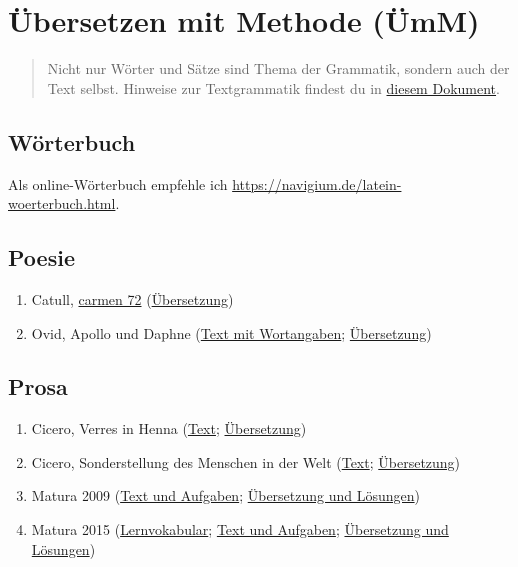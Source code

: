 \documentclass{scrartcl}
\begin{document}
\section{Übersetzen mit Methode (ÜmM)}
\label{sec:org364c73a}
\begin{quote}
Nicht nur Wörter und Sätze sind Thema der Grammatik, sondern auch der Text selbst. Hinweise zur Textgrammatik findest du in \href{https://www.dropbox.com/s/fbswvhejksw6kl6/pronomina.pdf?dl=0}{diesem Dokument}.
\end{quote}

\subsection{Wörterbuch}
\label{sec:org921034b}
Als online-Wörterbuch empfehle ich \url{https://navigium.de/latein-woerterbuch.html}.

\subsection{Poesie}
\label{sec:org08a901e}
\begin{enumerate}
\item Catull, \href{https://www.dropbox.com/s/kc2coqw11nfxyj1/Catull72.pdf?dl=0}{carmen 72} (\href{http://www.gottwein.de/Lat/catull/catull072.php}{Übersetzung})
\item Ovid, Apollo und Daphne (\href{https://www.dropbox.com/s/g60dha8uuh5h0po/OVIDApolloDaphne.pdf?dl=0}{Text mit Wortangaben}; \href{https://www.dropbox.com/s/366v4v48njyzebm/\%25C3\%259CApollDaphne.pdf?dl=0}{Übersetzung})
\end{enumerate}

\subsection{Prosa}
\label{sec:org26a2877}
\begin{enumerate}
\item Cicero, Verres in Henna (\href{https://www.dropbox.com/s/gqrgxo7yjxglmdv/Matura\_LatInt\_schriftlich\_2016.pdf?dl=0}{Text}; \href{https://www.dropbox.com/s/h6y42hky2w0o2x9/\%25C3\%259Cbersetzung.pdf?dl=0}{Übersetzung})
\item Cicero, Sonderstellung des Menschen in der Welt (\href{https://www.dropbox.com/s/22oxzqeor9vqb67/LatIntSchriftlMatura2009.pdf?dl=0}{Text}; \href{https://www.dropbox.com/s/ieihesw9h0rkejd/\%25C3\%259CbersetzungMaturaLatIntensiv2009.pdf?dl=0}{Übersetzung})
\item Matura 2009 (\href{https://www.dropbox.com/s/fnt9bzwl6hklwv6/SPFSchriftlich2009.pdf?dl=0}{Text und Aufgaben}; \href{https://www.dropbox.com/s/hh89pcj1sy28kby/KorrekturSchriftlMaturaSPF2009.pdf?dl=0}{Übersetzung und Lösungen})
\item Matura 2015 (\href{https://www.dropbox.com/s/hl878959yooat32/Voki.pdf?dl=0}{Lernvokabular}; \href{https://www.dropbox.com/s/8qaeceb1qyemfwz/KSS\_Matura2015\_final.pdf?dl=0}{Text und Aufgaben}; \href{https://www.dropbox.com/s/xwvzrif0nu15j8h/Korrketur\_SPF\_Latein\_2015.pdf?dl=0}{Übersetzung und
Lösungen})
\end{enumerate}
\end{document}
